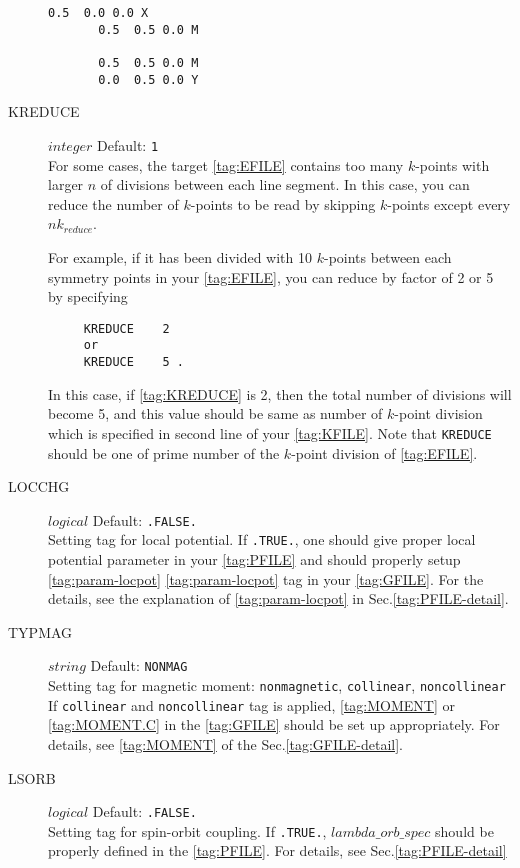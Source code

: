\documentclass[a4paper,12pt]{scrartcl}
\makeatletter
\def\namedlabel#1#2{\begingroup
    #2%
    \def\@currentlabel{#2}%
    \phantomsection\label{#1}\endgroup
}
\makeatother
\begin{document}
\begin{description}
\begin{Verbatim}[commandchars=\\\{\},gobble=4, frame=single, framesep=2mm, 
            label= KPOINTS\_BAND $line$ $mode$ (FHI-aims type), 
            labelposition=bottomline]
       0.5  0.0 0.0 X
       0.5  0.5 0.0 M

       0.5  0.5 0.0 M
       0.0  0.5 0.0 Y
        \end{Verbatim}        

  	
  	\item[\namedlabel{tag:KREDUCE}{KREDUCE}] $integer$ Default: \texttt{1}  \\
		For some cases, the target \ref{tag:EFILE} contains too many $k$-points with 
		larger $n$ of divisions between each line segment. In this case, 
		you can reduce the number of $k$-points to be read by skipping $k$-points except every $nk_{reduce}$. 
	
		For example, if it has been divided with 10 $k$-points between each symmetry points in your \ref{tag:EFILE}, you can reduce by factor of 2 or 5 by specifying 
     \begin{verbatim}
     KREDUCE    2
     or
     KREDUCE    5 .
     \end{verbatim}
	  In this case, if \ref{tag:KREDUCE} is 2, then the total number of divisions will
	  become 5, and this value should be same as number of $k$-point division 
	  which is specified in second line of your \ref{tag:KFILE}. 
	  Note that \texttt{KREDUCE} should be one of prime number of the 
	  $k$-point division of \ref{tag:EFILE}. 
	  
    \item[\namedlabel{tag:LOCCHG}{LOCCHG}] $logical$ Default: \texttt{.FALSE.} \\
        Setting tag for local potential.
        If \texttt{.TRUE.}, one should give proper local potential parameter 
		in your \ref{tag:PFILE} and should properly setup \ref{tag:param-locpot} \ref{tag:param-locpot} 
		tag in your \ref{tag:GFILE}. For the details, see the explanation of
		\ref{tag:param-locpot} in Sec.\ref{tag:PFILE-detail}.

    \item[\namedlabel{tag:TYPMAG}{TYPMAG}] $string$ Default: \texttt{NONMAG} \\
        Setting tag for magnetic moment: \texttt{nonmagnetic}, \texttt{collinear}, 
		\texttt{noncollinear}
		If \texttt{collinear} and \texttt{noncollinear} tag is applied, 
		\ref{tag:MOMENT} or \ref{tag:MOMENT.C} in the \ref{tag:GFILE}
		should be set up appropriately.
		For details, see \ref{tag:MOMENT} of the Sec.\ref{tag:GFILE-detail}.

    \item[\namedlabel{tag:LSORB}{LSORB}] $logical$ Default: \texttt{.FALSE.} \\
        Setting tag for spin-orbit coupling. 
		If \texttt{.TRUE.}, $lambda\_orb\_spec$ should be properly defined in the
		\ref{tag:PFILE}. For details, see Sec.\ref{tag:PFILE-detail}


\end{description}
\end{document}
